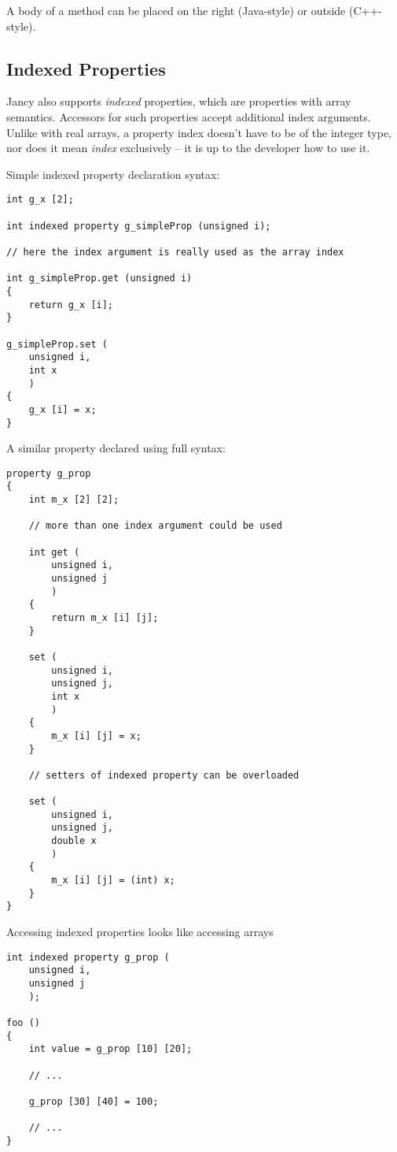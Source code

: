 \documentclass[oneside]{book}
\begin{document}
A body of a method can be placed on the right (Java-style) or outside (C++-style).

\subsection{Indexed Properties}
Jancy also supports \emph{indexed} properties, which are properties with array semantics. Accessors for such properties accept additional index arguments. Unlike with real arrays, a property index doesn't have to be of the integer type, nor does it mean \emph{index} exclusively -- it is up to the developer how to use it.

Simple indexed property declaration syntax:

\begin{lstlisting}
int g_x [2];

int indexed property g_simpleProp (unsigned i);

// here the index argument is really used as the array index

int g_simpleProp.get (unsigned i)
{
    return g_x [i];
}

g_simpleProp.set (
    unsigned i,
    int x
    )
{
    g_x [i] = x;
}
\end{lstlisting}

A similar property declared using full syntax:

\begin{lstlisting}
property g_prop
{   
    int m_x [2] [2];

    // more than one index argument could be used

    int get (
        unsigned i,
        unsigned j
        )
    {
        return m_x [i] [j];
    }

    set (
        unsigned i,
        unsigned j,
        int x
        )
    {
        m_x [i] [j] = x;
    }

    // setters of indexed property can be overloaded

    set (
        unsigned i,
        unsigned j,
        double x
        )
    {
        m_x [i] [j] = (int) x;
    }
}
\end{lstlisting}

Accessing indexed properties looks like accessing arrays

\begin{lstlisting}
int indexed property g_prop (
    unsigned i,
    unsigned j
    );

foo ()
{
    int value = g_prop [10] [20];

    // ...

    g_prop [30] [40] = 100;

    // ...
}
\end{lstlisting}
\end{document}
